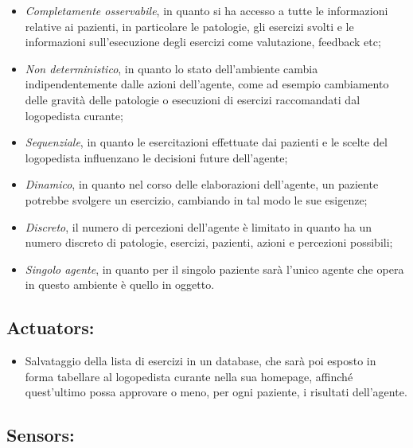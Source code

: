 \documentclass{article}
\begin{document}
    \begin{itemize}
        \item \textit{Completamente osservabile}, in quanto si ha accesso a tutte le informazioni relative ai pazienti, in particolare le patologie, gli esercizi svolti e le informazioni sull'esecuzione degli esercizi come valutazione, feedback etc;
        \item \textit{Non deterministico}, in quanto lo stato dell’ambiente cambia indipendentemente dalle azioni dell’agente, come ad esempio cambiamento delle gravità delle patologie o esecuzioni di esercizi raccomandati dal logopedista curante;
        \item \textit{Sequenziale}, in quanto le esercitazioni effettuate dai pazienti e le scelte del logopedista influenzano le decisioni future dell’agente;
        \item \textit{Dinamico}, in quanto nel corso delle elaborazioni dell’agente, un paziente potrebbe svolgere un esercizio, cambiando in tal modo le sue esigenze;
        \item \textit{Discreto}, il numero di percezioni dell’agente è limitato in quanto ha un numero discreto di patologie, esercizi, pazienti, azioni e percezioni possibili;
        \item \textit{Singolo agente}, in quanto per il singolo paziente sarà l’unico agente che opera in questo ambiente è quello in oggetto.
    \end{itemize}

    \subsection{Actuators:}

    \begin{itemize}
        \item Salvataggio della lista di esercizi in un database, che sarà poi esposto in forma tabellare  al logopedista curante nella sua homepage, affinché quest'ultimo possa approvare o meno, per ogni paziente, i risultati dell'agente.
    \end{itemize}

    \subsection{Sensors:}
\end{document}
